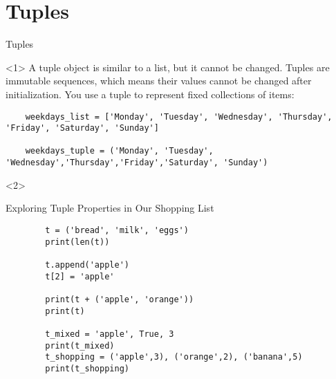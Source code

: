 \section{Tuples}
\label{sec:tuples}


\begin{frame}[fragile]{Tuples}
  \begin{onlyenv}<1>
    A tuple object is similar to a list, but it cannot be changed. Tuples are immutable sequences, which means their values cannot be changed after initialization. You use a tuple to represent fixed collections of items:
    \begin{lstlisting}
    weekdays_list = ['Monday', 'Tuesday', 'Wednesday', 'Thursday', 'Friday', 'Saturday', 'Sunday']
    
    weekdays_tuple = ('Monday', 'Tuesday', 'Wednesday','Thursday','Friday','Saturday', 'Sunday')
  \end{lstlisting}
  \end{onlyenv}

  \begin{onlyenv}<2>
    \begin{exercise}{Exploring Tuple Properties in Our Shopping List}
      \begin{lstlisting}
        t = ('bread', 'milk', 'eggs')
        print(len(t))

        t.append('apple')
        t[2] = 'apple'

        print(t + ('apple', 'orange'))
        print(t)

        t_mixed = 'apple', True, 3
        print(t_mixed)
        t_shopping = ('apple',3), ('orange',2), ('banana',5)
        print(t_shopping)
      \end{lstlisting}
    \end{exercise}
  \end{onlyenv}
\end{frame}


